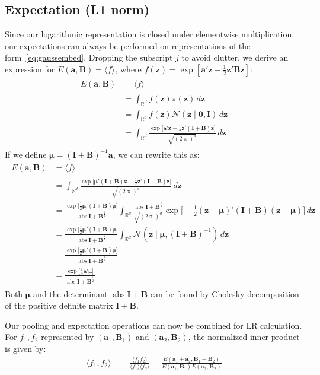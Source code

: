 \documentclass[a4paper,oneside,12pt,english]{report}
\def\zvec{\mathbf{z}}
\def\ND{\mathcal{N}}
\DeclareMathOperator{\abs}{abs}
\def\expv#1#2{\bigl\langle#1\bigr\rangle_{#2}}
\def\expp#1{\bigl\langle#1\bigr\rangle}
\def\R{\mathbb{R}}
\def\Bmat{\mathbf{B}}
\def\Imat{\mathbf{I}}
\def\muvec{\boldsymbol{\mu}}
\def\avec{\mathbf{a}}
\def\nulvec{\boldsymbol{0}}
\def\dot#1#2{\expv{#1,#2}{}}
\def\normal#1{\overline{#1}}
\def\dotn#1#2{\dot{\normal{#1}}{\normal{#2}}}
\begin{document}
\subsection{Expectation (L1 norm)}
Since our logarithmic representation is closed under elementwise multiplication, our expectations can always be performed on representations of the form~\eqref{eq:gaussembed}. Dropping the subscript $j$ to avoid clutter, we derive an expression for $E(\avec,\Bmat)=\expv{f}{}$, where $f(\zvec)=\exp[\avec'\zvec-\frac12\zvec'\Bmat\zvec]$:
\begin{align}
\label{eq:MVGproblem}
\begin{split}
E(\avec,\Bmat) &= \expv{f}{} \\
&= \int_{\R^d} f(\zvec)\pi(\zvec) \,d\zvec \\
&= \int_{\R^d} f(\zvec)\ND(\zvec\mid\nulvec,\Imat) \,d\zvec \\
&= \int_{\R^d} \frac{\exp\bigl[\avec'\zvec -\frac12\zvec'(\Imat+\Bmat)\zvec\bigr]}{\sqrt{(2\uppi)^d}} \,d\zvec 
\end{split}
\end{align}
If we define $\muvec=(\Imat+\Bmat)^{-1}\avec$, we can rewrite this as:
\begin{align}
\label{eq:exactMVG}
\begin{split}
E(\avec,\Bmat) &= \expv{f}{} \\
&= \int_{\R^d} \frac{\exp\bigl[\muvec'(\Imat+\Bmat)\zvec -\frac12\zvec'(\Imat+\Bmat)\zvec\bigr]}{\sqrt{(2\uppi)^d}} \,d\zvec \\
&= \frac{\exp\bigl[\frac12\muvec'(\Imat+\Bmat)\muvec\bigr]}{\abs{\Imat+\Bmat}^{\frac12}}
\int_{\R^d} \frac{\abs{\Imat+\Bmat}^\frac12}{\sqrt{(2\uppi)^d}} \exp\bigl[-\frac12(\zvec-\muvec)'(\Imat+\Bmat)(\zvec-\muvec)\bigr]\,d\zvec \\
&= \frac{\exp\bigl[\frac12\muvec'(\Imat+\Bmat)\muvec\bigr]}{\abs{\Imat+\Bmat}^{\frac12}} \int_{\R^d} \ND(\zvec\mid\muvec,(\Imat+\Bmat)^{-1}) \,d\zvec \\
&= \frac{\exp\bigl[\frac12\muvec'(\Imat+\Bmat)\muvec\bigr]}{\abs{\Imat+\Bmat}^{\frac12}} \\
&= \frac{\exp\bigl[\frac12\avec'\muvec\bigr]}{\abs{\Imat+\Bmat}^{\frac12}} 
\end{split}
\end{align}
Both $\muvec$ and the determinant $\abs{\Imat+\Bmat}$ can be found by Cholesky decomposition of the positive definite matrix $\Imat+\Bmat$. 

Our pooling and expectation operations can now be combined for LR calculation. For $f_1,f_2$ represented by $(\avec_1,\Bmat_1)$ and $(\avec_2,\Bmat_2)$, the normalized inner product is given by:
\begin{align}
\label{eq:LRMVG}
\dotn{f_1}{f_2} &= \frac{\expp{f_1f_2}}{\expp{f_1}\expp{f_2}} = \frac{E(\avec_1+\avec_2,\Bmat_1+\Bmat_2)}{E(\avec_1,\Bmat_1)E(\avec_2,\Bmat_2)}
\end{align}
\end{document}
